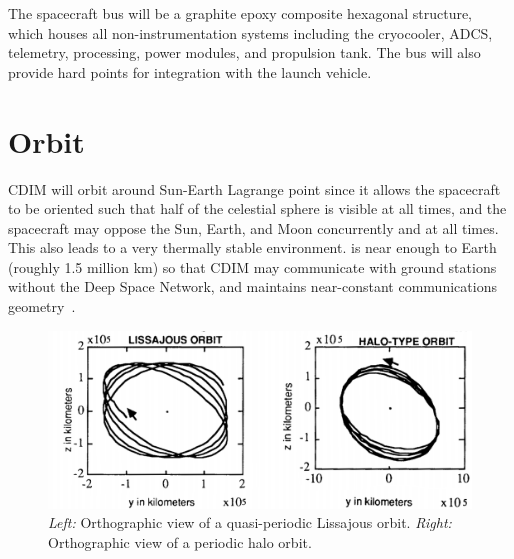 \documentclass{ws-jai}
\begin{document}
The spacecraft bus will be a graphite epoxy composite hexagonal structure, which houses all non-instrumentation systems including the cryocooler, ADCS, telemetry, processing, power modules, and propulsion tank.
The bus will also provide hard points for integration with the launch vehicle.


\section{Orbit}
\label{sec:orbit}
CDIM will orbit around Sun-Earth Lagrange point \Ltwo{} since it allows the spacecraft to be oriented such that half of the celestial sphere is visible at all times, and the spacecraft may oppose the Sun, Earth, and Moon concurrently and at all times.
This also leads to a very thermally stable environment.
\Ltwo{} is near enough to Earth (roughly 1.5 million \si{\kilo\meter}) so that CDIM may communicate with ground stations without the Deep Space Network, and maintains near-constant communications geometry~\cite{canalias2004}.

\begin{figure}[!h]
  \centering
  \includegraphics[width=.6\linewidth]{figs/orbits.png}
  \caption{
      \emph{Left:} Orthographic view of a quasi-periodic Lissajous orbit.
      \emph{Right:} Orthographic view of a periodic halo orbit.~\cite{gordon1993orbit}
\label{fig:orbits}
  }
\end{figure}
\end{document}
